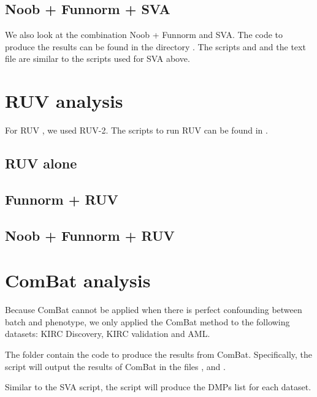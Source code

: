\documentclass[12pt]{article}
\begin{document}
\subsection{Noob + Funnorm + SVA}

We also look at the combination Noob + Funnorm  and SVA. The code to produce the results can be found in the directory . The scripts and  and the text file  are similar to the scripts used for SVA above. 

\section{RUV analysis}

For RUV , we used RUV-2.  The scripts to run RUV can be found in . 

\subsection{RUV alone}

\subsection{Funnorm + RUV}

\subsection{Noob + Funnorm + RUV}


\section{ComBat analysis}

Because ComBat cannot be applied when there is perfect confounding between batch and phenotype, we only applied the ComBat method to the following datasets: KIRC Discovery, KIRC validation and AML. 

The folder  contain the code to produce the results from ComBat. Specifically, the script  will output the results of ComBat in the files 
,  and . 

Similar to the SVA script, the script  will produce the DMPs list for each dataset. 
\end{document}
